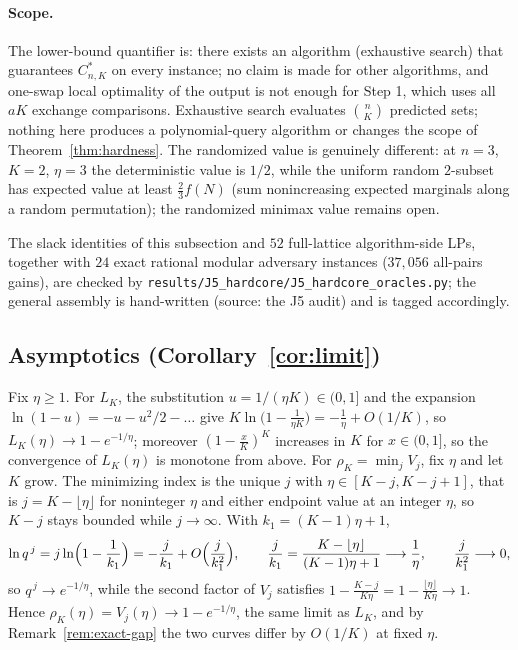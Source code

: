 \paragraph{Scope.}
The lower-bound quantifier is: there exists an algorithm (exhaustive
search) that guarantees $C^{*}_{n,K}$ on every instance; no claim is made
for other algorithms, and one-swap local optimality of the output is not
enough for Step 1, which uses all $aK$ exchange comparisons.  Exhaustive
search evaluates $\binom nK$ predicted sets; nothing here produces a
polynomial-query algorithm or changes the scope of
Theorem~\ref{thm:hardness}.  The randomized value is genuinely different: at $n=3$, $K=2$, $\eta=3$ the
deterministic value is $1/2$, while the uniform random $2$-subset has
expected value at least $\tfrac23f(N)$ (sum nonincreasing expected
marginals along a random permutation); the randomized minimax value
remains open.

The slack identities of this subsection and $52$ full-lattice
algorithm-side LPs, together with $24$ exact rational modular adversary
instances ($37{,}056$ all-pairs gains), are checked by
\texttt{results/J5\_hardcore/J5\_hardcore\_oracles.py}; the general
assembly is hand-written (source: the J5 audit) and is tagged accordingly.

\subsection{Asymptotics (Corollary~\ref{cor:limit})}\label{app:asymptotics}

Fix $\eta\ge1$.  For $L_K$, the substitution $u=1/(\eta K)\in(0,1]$ and the
expansion $\ln(1-u)=-u-u^{2}/2-\dots$ give
$K\ln\bigl(1-\tfrac{1}{\eta K}\bigr)=-\tfrac1\eta+O(1/K)$, so
$L_K(\eta)\to1-e^{-1/\eta}$; moreover $(1-\tfrac{x}{K})^{K}$ increases in $K$
for $x\in(0,1]$, so the convergence of $L_K(\eta)$ is monotone from above.  For
$\rho_K=\min_jV_j$, fix $\eta$ and let $K$ grow.  The minimizing index is the
unique $j$ with $\eta\in[K-j,K-j+1]$, that is $j=K-\lfloor\eta\rfloor$ for
noninteger $\eta$ and either endpoint value at an integer $\eta$, so
$K-j$ stays bounded while $j\to\infty$.  With $k_1=(K-1)\eta+1$,
\[
  \ln q^{\,j}=j\ln\Bigl(1-\frac1{k_1}\Bigr)=-\frac{j}{k_1}+O\Bigl(\frac{j}{k_1^{2}}\Bigr),
  \qquad \frac{j}{k_1}=\frac{K-\lfloor\eta\rfloor}{(K-1)\eta+1}\longrightarrow\frac1\eta,
  \qquad \frac{j}{k_1^{2}}\longrightarrow0,
\]
so $q^{\,j}\to e^{-1/\eta}$, while the second factor of $V_j$ satisfies
$1-\frac{K-j}{K\eta}=1-\frac{\lfloor\eta\rfloor}{K\eta}\to1$.  Hence
$\rho_K(\eta)=V_j(\eta)\to1-e^{-1/\eta}$, the same limit as $L_K$, and by
Remark~\ref{rem:exact-gap} the two curves differ by $O(1/K)$ at fixed $\eta$.

